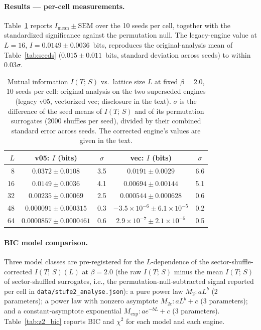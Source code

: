 \documentclass[aps,pra,twocolumn,superscriptaddress,showpacs,floatfix]{revtex4-2}
\newcommand{\MI}{I(T;\,S)}
\begin{document}
\paragraph{Results --- per-cell measurements.}
Table~\ref{tab:z2_scaling} reports $I_\mathrm{mean} \pm \mathrm{SEM}$ over the
10 seeds per cell, together with the standardized significance against the
permutation null. The legacy-engine value at $L=16$, $I = 0.0149 \pm 0.0036$~bits,
reproduces the original-analysis mean of Table~\ref{tab:seeds}
($0.015 \pm 0.011$~bits, standard deviation across seeds) to within
$0.03\sigma$.

\begin{table}[b]
\caption{Mutual information $\MI$ vs.\ lattice size $L$ at fixed $\beta=2.0$, 10 seeds per cell: original analysis on the two superseded engines (legacy v05, vectorized vec; disclosure in the text). $\sigma$ is the difference of the seed means of $\MI$ and of its permutation surrogates (2000 shuffles per seed), divided by their combined standard error across seeds. The corrected engine's values are given in the text.}
\label{tab:z2_scaling}
\begin{ruledtabular}
\begin{tabular}{rcccc}
$L$ & v05: $I$ (bits) & $\sigma$ & vec: $I$ (bits) & $\sigma$ \\
\hline
 8 & $0.0372 \pm 0.0108$    & 3.5 & $0.0191 \pm 0.0029$     & 6.6 \\
16 & $0.0149 \pm 0.0036$    & 4.1 & $0.00694 \pm 0.00144$   & 5.1 \\
32 & $0.00235 \pm 0.00069$  & 2.5 & $0.000544 \pm 0.000628$ & 0.6 \\
48 & $0.000091 \pm 0.000315$ & 0.3 & $-3.5\!\times\!10^{-6} \pm 6.1\!\times\!10^{-5}$ & 0.2 \\
64 & $0.0000857 \pm 0.0000461$ & 0.6 & $2.9\!\times\!10^{-7} \pm 2.1\!\times\!10^{-5}$ & 0.5 \\
\end{tabular}
\end{ruledtabular}
\end{table}

\paragraph{BIC model comparison.}
Three model classes are pre-registered for the $L$-dependence of the
sector-shuffle-corrected $\MI(L)$ at $\beta=2.0$ (the raw $\MI$ minus the mean
$\MI$ of sector-shuffled surrogates, i.e., the permutation-null-subtracted
signal reported per cell in \texttt{data/stufe2\_analyse.json}): a pure power law
$M_2 : a L^{b}$ (2 parameters); a power law with nonzero asymptote
$M_{2c} : a L^{b} + c$ (3 parameters); and a constant-asymptote exponential
$M_\mathrm{exp} : a e^{-b L} + c$ (3 parameters). Table~\ref{tab:z2_bic}
reports BIC and $\chi^2$ for each model and each engine.
\end{document}
